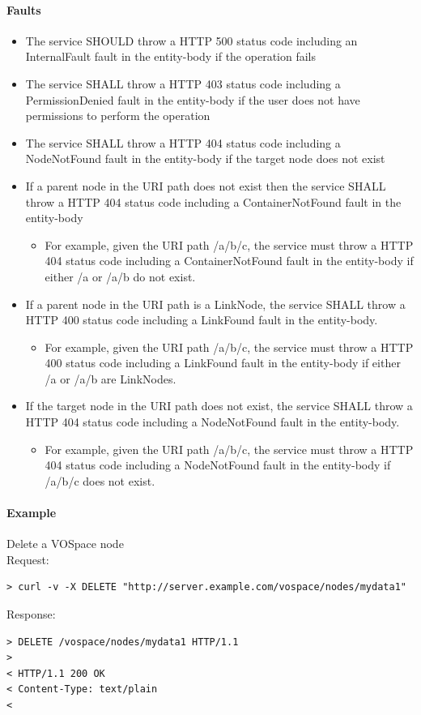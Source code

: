 \documentclass[11pt,a4paper]{ivoa}
\begin{document}
\paragraph{Faults}
\begin{itemize}
    \item The service SHOULD throw a HTTP 500 status code including an InternalFault fault in the entity-body if the operation fails
    \item The service SHALL throw a HTTP 403 status code including a PermissionDenied fault in the entity-body if the user does not have permissions to perform the operation
    \item The service SHALL throw a HTTP 404 status code including a NodeNotFound fault in the entity-body if the target node does not exist
    \item If a parent node in the URI path does not exist then the service SHALL throw a HTTP 404 status code including a ContainerNotFound fault in the entity-body
    \begin{itemize}
        \item For example, given the URI path /a/b/c, the service must throw a HTTP 404 status code including a ContainerNotFound fault in the entity-body if either /a or /a/b do not exist.
    \end{itemize}
    \item If a parent node in the URI path is a LinkNode, the service SHALL throw a HTTP 400 status code including a LinkFound fault in the entity-body.
    \begin{itemize}
        \item For example, given the URI path /a/b/c, the service must throw a HTTP 400 status code including a LinkFound fault in the entity-body if either /a or /a/b are LinkNodes.
    \end{itemize}
    \item If the target node in the URI path does not exist, the service SHALL throw a HTTP 404 status code including a NodeNotFound fault in the entity-body.
    \begin{itemize}
        \item For example, given the URI path /a/b/c, the service must throw a HTTP 404 status code including a NodeNotFound fault in the entity-body if /a/b/c does not exist.
    \end{itemize}
\end{itemize}

\paragraph{Example}
Delete a VOSpace node
\\[5px]
\noindent
Request:
\begin{lstlisting}
> curl -v -X DELETE "http://server.example.com/vospace/nodes/mydata1"
\end{lstlisting}
Response:
\begin{lstlisting}
> DELETE /vospace/nodes/mydata1 HTTP/1.1
>
< HTTP/1.1 200 OK
< Content-Type: text/plain
<
\end{lstlisting}
\end{document}
